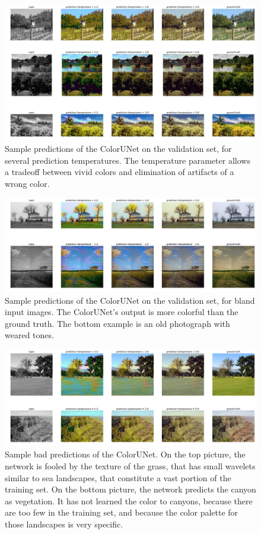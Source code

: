 \documentclass[10pt,twocolumn,letterpaper]{article}
\begin{document}
\begin{figure}
\begin{center}
\includegraphics[width=450px]{good}
\caption{Sample predictions of the ColorUNet on the validation set, for several prediction temperatures. The temperature parameter allows a tradeoff between vivid colors and elimination of artifacts of a wrong color.}
\label{good}
\end{center}
\end{figure}

\begin{figure}
\begin{center}
\includegraphics[width=450px]{better}
\caption{Sample predictions of the ColorUNet on the validation set, for bland input images. The ColorUNet's output is more colorful than the ground truth. The bottom example is an old photograph with weared tones.}
\label{better}
\end{center}
\end{figure}

\begin{figure}
\begin{center}
\includegraphics[width=450px]{worse}
\caption{Sample bad predictions of the ColorUNet. On the top picture, the network is fooled by the texture of the grass, that has small wavelets similar to sea landscapes, that constitute a vast portion of the training set. On the bottom picture, the network predicts the canyon as vegetation. It has not learned the color to canyons, because there are too few in the training set, and because the color palette for those landscapes is very specific.}
\label{worse}
\end{center}
\end{figure}
\end{document}
